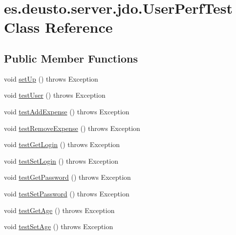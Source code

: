 \hypertarget{classes_1_1deusto_1_1server_1_1jdo_1_1_user_perf_test}{}\section{es.\+deusto.\+server.\+jdo.\+User\+Perf\+Test Class Reference}
\label{classes_1_1deusto_1_1server_1_1jdo_1_1_user_perf_test}
\subsection*{Public Member Functions}
\begin{DoxyCompactItemize}
\item 
void \hyperlink{classes_1_1deusto_1_1server_1_1jdo_1_1_user_perf_test_a9f45a1081d058c5d1b0ca81d4cb42389}{set\+Up} ()  throws Exception 
\item 
void \hyperlink{classes_1_1deusto_1_1server_1_1jdo_1_1_user_perf_test_a556ef1732826be65497e0979bb7d063a}{test\+User} ()  throws Exception 
\item 
void \hyperlink{classes_1_1deusto_1_1server_1_1jdo_1_1_user_perf_test_a8a26de462670fc0cb6a9aacaff6a748e}{test\+Add\+Expense} ()  throws Exception 
\item 
void \hyperlink{classes_1_1deusto_1_1server_1_1jdo_1_1_user_perf_test_a06f28a2724cb1209482f9e763ae4edb7}{test\+Remove\+Expense} ()  throws Exception 
\item 
void \hyperlink{classes_1_1deusto_1_1server_1_1jdo_1_1_user_perf_test_a8cef1f0b373d1d1f82a2551b3d06c4e1}{test\+Get\+Login} ()  throws Exception 
\item 
void \hyperlink{classes_1_1deusto_1_1server_1_1jdo_1_1_user_perf_test_a10a1fd4974dd2062711534ebb76d76f9}{test\+Set\+Login} ()  throws Exception 
\item 
void \hyperlink{classes_1_1deusto_1_1server_1_1jdo_1_1_user_perf_test_a06e76329edb07356939ca82296a5c55c}{test\+Get\+Password} ()  throws Exception 
\item 
void \hyperlink{classes_1_1deusto_1_1server_1_1jdo_1_1_user_perf_test_a0ed777a0ed7150eb0a748b90959b5d0b}{test\+Set\+Password} ()  throws Exception 
\item 
void \hyperlink{classes_1_1deusto_1_1server_1_1jdo_1_1_user_perf_test_a5ed71046387869777d48806b094f291a}{test\+Get\+Age} ()  throws Exception 
\item 
void \hyperlink{classes_1_1deusto_1_1server_1_1jdo_1_1_user_perf_test_a273b38521e147fc8d00a6d4d40e29028}{test\+Set\+Age} ()  throws Exception 

\end{DoxyCompactItemize}
